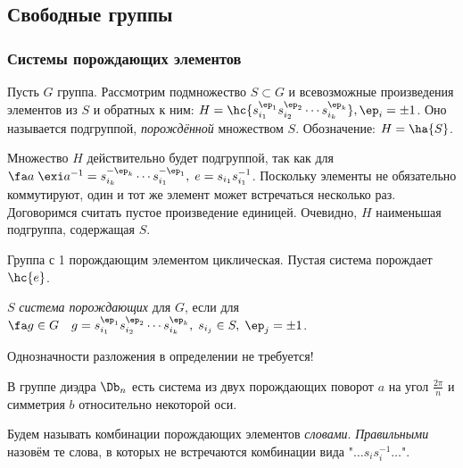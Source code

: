 \documentclass[a4paper]{article}
\begin{document}
\subsection{Свободные группы}

\subsubsection{Системы порождающих элементов}

\begin{df}
Пусть $G$ группа. Рассмотрим подмножество $S \subset G$ и всевозможные произведения элементов из $S$  и
обратных к ним: $H=\hc{s_{i_1}^{\ep_1}s_{i_2}^{\ep_2} \cdots s_{i_k}^{\ep_k}}, \ep_i = \pm 1$. Оно называется
подгруппой, \emph{порождённой} множеством $S$. Обозначение: $H = \ha{S}$.
\end{df}

Множество $H$ действительно будет подгруппой, так как для $\fa a \; \exi a^{-1} = s_{i_k}^{-\ep_k} \cdots
s_{i_1}^{-\ep_1}, \; e = s_{i_1}s_{i_1}^{-1}$. Поскольку элементы не обязательно коммутируют, один и тот же
элемент может встречаться несколько раз. Договоримся считать пустое произведение единицей. Очевидно, $H$
наименьшая подгруппа, содержащая $S$.

\begin{ex}
Группа с 1 порождающим элементом циклическая. Пустая система порождает $\hc{e}$.
\end{ex}

\begin{df}
$S$ \emph{система порождающих} для $G$, если для
$\fa g \in G \quad g=s_{i_1}^{\ep_1}s_{i_2}^{\ep_2} \cdots s_{i_k}^{\ep_k}, \; s_{i_j} \in S, \; \ep_j = \pm 1$.
\end{df}

\begin{note}
Однозначности разложения в определении не требуется!
\end{note}

\begin{ex}
В группе диэдра $\Db_n$ есть система из двух порождающих поворот $a$ на угол $\frac{2\pi}{n}$ и
симметрия $b$ относительно некоторой оси.
\end{ex}

\begin{df}
Будем называть комбинации порождающих элементов \emph{словами}. \emph{Правильными} назовём те слова,  в
которых не встречаются комбинации вида "$\ldots s_i s_i^{-1}\ldots$".
\end{df}
\end{document}
